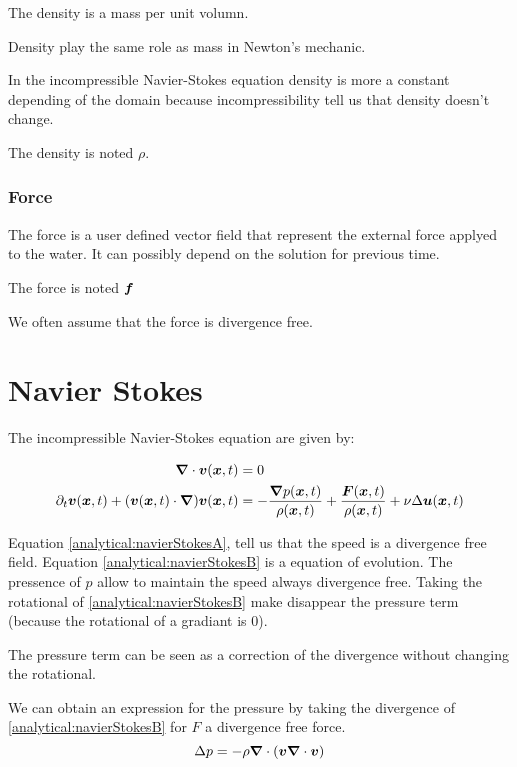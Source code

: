 The density is a mass per unit volumn.

Density play the same role as mass in Newton's mechanic.

In the incompressible Navier-Stokes equation density is more a constant depending
of the domain because incompressibility tell us that density doesn't change.

The density is noted $\rho$.

\subsubsection{Force}

The force is a user defined vector field that represent the external force applyed to the water.
It can possibly depend on the solution for previous time.

The force is noted ${\boldsymbol f}$

We often assume that the force is divergence free.
\section{Navier Stokes}

The incompressible Navier-Stokes equation are given by:

\begin{align}
\label{analytical:navierStokesA}
{\boldsymbol \nabla} \cdot {\boldsymbol v}({\boldsymbol x} ,t)&=0\\
\label{analytical:navierStokesB}
\partial_t {\boldsymbol v}({\boldsymbol x} ,t)+({\boldsymbol v}({\boldsymbol x},t)\cdot{\boldsymbol \nabla} ) {\boldsymbol v}({\boldsymbol x} ,t)&=-\frac{{\boldsymbol \nabla} p({\boldsymbol x},t)}{\rho({\boldsymbol x},t)}+\frac{{\boldsymbol F}({\boldsymbol x},t)}{\rho({\boldsymbol x},t)}+\nu \Delta {\boldsymbol u}({\boldsymbol x},t)
\end{align}

Equation \ref{analytical:navierStokesA}, tell us that the speed is a divergence free field.
Equation \ref{analytical:navierStokesB} is a equation of evolution. The pressence of $p$ allow to maintain the speed always divergence free.
Taking the rotational of \ref{analytical:navierStokesB} make disappear the pressure term (because the rotational of a gradiant is 0).

The pressure term can be seen as a correction of the divergence without changing the rotational.

We can obtain an expression for the pressure by taking the divergence of \ref{analytical:navierStokesB} for $F$ a divergence free force.
\begin{equation}
\label{true_pressure}
\Delta p=-\rho {\boldsymbol \nabla} \cdot ({\boldsymbol v}{\boldsymbol \nabla} \cdot {\boldsymbol v})
\end{equation}

